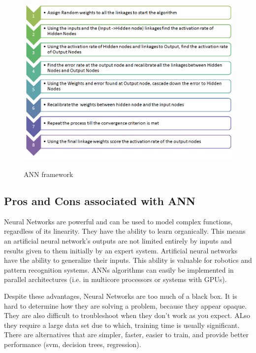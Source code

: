 \begin{figure}[H]
\centering
{\includegraphics[scale=0.5]{Annfw.png}}
\caption{ANN framework}
\end{figure}

\subsection{Pros and Cons associated with ANN} \label{Pros and Cons associated with ANN }

\noindent Neural Networks are powerful and can be used to model complex functions, regardless of its linearity. They have the ability to learn organically. This means an artificial neural network’s outputs are not limited entirely by inputs and results given to them initially by an expert system. Artificial neural networks have the ability to generalize their inputs. This ability is valuable for robotics and pattern recognition systems. ANNs algorithms can easily be implemented in parallel architectures (i.e. in multicore processors or systems with GPUs).

\noindent Despite these advantages, Neural Networks are too much of a black box. It is hard to determine how they are solving a problem, because they appear opaque. They are also  difficult to troubleshoot when they don't work as you expect. ALso they require a large data set due to which, training time is usually significant. There are alternatives that are simpler, faster, easier to train, and provide better performance (svm, decision trees, regression).
